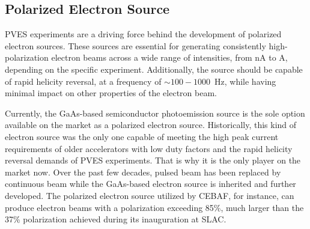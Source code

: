 \subsection{Polarized Electron Source}
PVES experiments are a driving force behind the development of polarized electron sources. 
These sources are essential for generating consistently high-polarization 
electron beams across a wide range of intensities, from nA to A, 
depending on the specific experiment. Additionally, the source should be 
capable of rapid helicity reversal, at a frequency of $\sim 100-1000$~Hz, while 
having minimal impact on other properties of the electron beam.

Currently, the GaAs-based semiconductor photoemission source is %
the sole option available on the market as a polarized electron source.
Historically, this kind of electron source was the only one capable of meeting
the high peak current requirements of older accelerators with low duty factors 
and the rapid helicity reversal demands of PVES experiments. 
That is why it is the only player on the market now.
Over the past few decades, pulsed beam has been replaced by continuous beam while
the GaAs-based electron source is inherited and further developed. The polarized electron
source utilized by CEBAF, for instance, can produce electron beams with a polarization exceeding
85\%, much larger than the 37\% polarization achieved during its inauguration at SLAC. \cite{PRESCOTT1978347}

